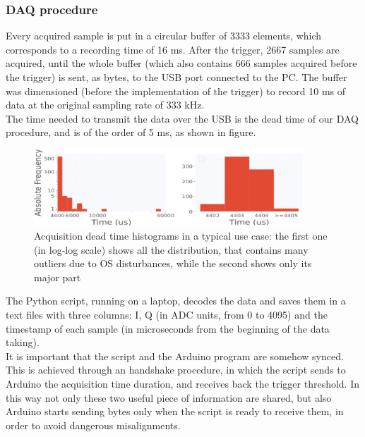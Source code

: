 \documentclass[12pt]{article}
\begin{document}
\subsubsection{DAQ procedure}
Every acquired sample is put in a circular buffer of 3333 elements, which corresponds to a recording time of 16 ms. After the trigger, 2667 samples are acquired, until the whole buffer (which also contains 666 samples acquired before the trigger) is sent, as bytes, to the USB port connected to the PC.
The buffer was dimensioned (before the implementation of the trigger) to record 10 ms of data at the original sampling rate of 333 kHz.
\\
The time needed to transmit the data over the USB is the dead time of our DAQ procedure, and is of the order of 5 ms, as shown in figure.
\begin{figure}[H]
\centering
    \includegraphics[width=0.9\textwidth]{dead_time_hist.pdf}
    \footnotesize{\caption{Acquisition dead time histograms in a typical use case: the first one (in log-log scale) shows all the distribution, that contains many outliers due to OS disturbances, while the second shows only its major part}}
\end{figure}
The Python script, running on a laptop, decodes the data and saves them in a text files with three columns: I, Q (in ADC units, from 0 to 4095) and the timestamp of each sample (in microseconds from the beginning of the data taking).\\
It is important that the script and the Arduino program are somehow synced. This is achieved through an handshake procedure, in which the script sends to Arduino the acquisition time duration, and receives back the trigger threshold. In this way not only these two useful piece of information are shared, but also Arduino starts sending bytes only when the script is ready to receive them, in order to avoid dangerous misalignments.
\end{document}
